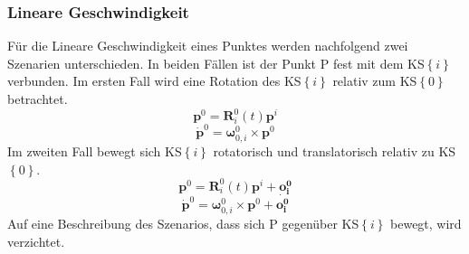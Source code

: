 \subsubsection{Lineare Geschwindigkeit}
Für die Lineare Geschwindigkeit eines Punktes werden nachfolgend zwei Szenarien unterschieden. In beiden Fällen ist der Punkt P fest mit dem KS$\left\{i\right\}$ verbunden. Im ersten Fall wird eine Rotation des KS$\left\{i\right\}$ relativ zum KS$\left\{0\right\}$ betrachtet. 
\begin{equation}
	\bm{p}^0 = \bm{R}^0_i(t)\bm{p}^i
\end{equation}
%
\begin{equation}
	\dot{\bm{p}}^0 = \bm{\omega}^0_{0,i}\times\bm{p}^0
\end{equation}
%
Im zweiten Fall bewegt sich KS$\left\{i\right\}$ rotatorisch und translatorisch relativ zu KS$\left\{0\right\}$. 
\begin{equation}
	\bm{p}^0 = \bm{R}^0_i(t)\bm{p}^i + \bm{o^0_i}
\end{equation}
%
\begin{equation}
	\dot{\bm{p}}^0 = \bm{\omega}^0_{0,i}\times\bm{p}^0 + \dot{\bm{o^0_i}}
\end{equation}
Auf eine Beschreibung des Szenarios, dass sich P gegenüber KS$\left\{i\right\}$ bewegt, wird verzichtet.
%





